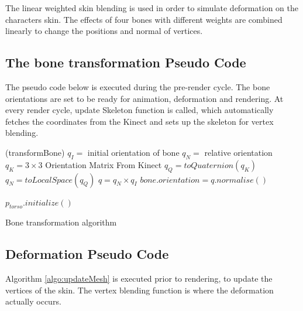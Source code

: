 The linear weighted skin blending \cite{Kavan2003} is used in order to simulate deformation on the characters skin. The effects of four bones with different weights are
combined linearly to change the positions and normal of vertices.

\subsection{The bone transformation Pseudo Code}

The pseudo code below is executed during the pre-render cycle. The bone
orientations are set to be ready for animation, deformation and rendering. At
every render cycle, update Skeleton function is called, which automatically
fetches the coordinates from the Kinect and sets up the skeleton for vertex
blending. 

\begin{algorithm}
\dontprintsemicolon %
\function(transformBone){
$q_I =$ initial orientation of bone\;
$q_N =$ relative orientation\;
$q_K = 3\times3$ Orientation Matrix From Kinect\;
 {
  $q_Q = toQuaternion(q_K)$\;
  $q_N = toLocalSpace(q_Q)$\;
  $q = q_N \times q_I$\;
  $bone.orientation=q.normalise{\left(\right)}$\; }}

 {
  $p_{torso}.initialize()$  \;
 }
\caption{Bone transformation algorithm}
\label{algo:transformBone}
\end{algorithm}

\subsection{Deformation Pseudo Code}

Algorithm \ref{algo:updateMesh} is executed prior to rendering, to update the
vertices of the skin. The vertex blending function is where the deformation
actually occurs.

